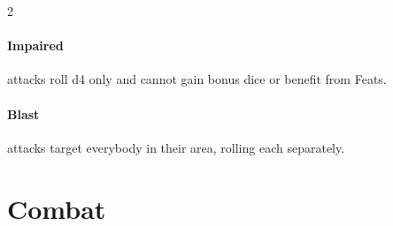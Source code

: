 \documentclass{osr-template/zine}
\begin{document}
\begin{multicols*}{2}
\paragraph{Impaired} attacks roll d4 only and cannot
gain bonus dice or benefit from Feats.

\paragraph{Blast} attacks target everybody in their area,
rolling each separately.

\end{multicols*}

\newpage
\section*{\centering \fontsize{35}{45}\selectfont Combat}
\vspace*{0.4 cm}
\end{document}
